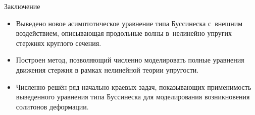 \documentclass[usenames,dvipsnames]{beamer}
\begin{document}
\begin{frame}{Заключение}
\begin{itemize}
	\item Выведено новое асимптотическое уравнение типа Буссинеска с~внешним воздействием, описывающая продольные волны в~нелинейно упругих стержнях круглого сечения.
	\item Построен метод, позволяющий численно моделировать полные уравнения движения стержня в рамках нелинейной теории упругости.
	\item Численно решён ряд начально-краевых задач, показывающих применимость выведенного уравнения типа Буссинеска для моделирования возникновения солитонов деформации.
\end{itemize}

\end{frame}
\end{document}
